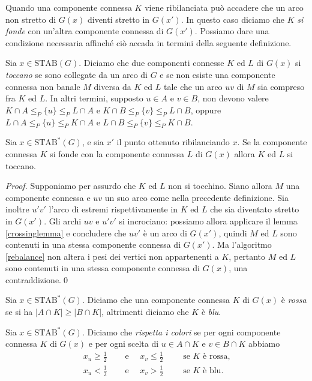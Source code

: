 Quando una componente connessa \(K\) viene ribilanciata pu\`o accadere che un arco non stretto di \(G(x)\) diventi stretto in \(G(x')\). In questo caso diciamo che \(K\) \emph{si fonde} con un'altra componente connessa di \(G(x')\). Possiamo dare una condizione necessaria affinch\'e ci\`o accada in termini della seguente definizione.
\begin{definition}
    Sia \(x\in\text{STAB}(G)\). Diciamo che due componenti connesse \(K\) ed \(L\) di \(G(x)\) si \emph{toccano} se sono collegate da un arco di \(G\) e se non esiste una componente connessa non banale \(M\) diversa da \(K\) ed \(L\) tale che un arco \(uv\) di \(M\) sia compreso fra \(K\) ed \(L\). In altri termini, supposto \(u\in A\) e \(v\in B\), non devono valere \(K\cap A\le_{P}\{u\}\le_{P}L\cap A\) e \(K\cap B\le_{P}\{v\}\le_{P}L\cap B\), oppure \(L\cap A\le_{P}\{u\}\le_{P}K\cap A\) e \(L\cap B\le_{P}\{v\}\le_{P}K\cap B\).
\end{definition}
\begin{lemma}
	\label{touchinglemma} Sia \(x\in\text{STAB}^{*}(G)\), e sia \(x'\) il punto ottenuto ribilanciando \(x\). Se la componente connessa \(K\) si fonde con la componente connessa \(L\) di \(G(x)\) allora \(K\) ed \(L\) si toccano.
\end{lemma}
\begin{proof}
	Supponiamo per assurdo che \(K\) ed \(L\) non si tocchino. Siano allora \(M\) una componente connessa e \(uv\) un suo arco come nella precedente definizione. Sia inoltre \(u'v'\) l'arco di estremi rispettivamente in \(K\) ed \(L\) che sia diventato stretto in \(G(x')\). Gli archi \(uv\) e \(u'v'\) si incrociano: possiamo allora applicare il lemma \ref{crossinglemma} e concludere che \(uv'\) \`e un arco di \(G(x')\), quindi  \(M\) ed \(L\) sono contenuti in una stessa componente connessa di \(G(x')\). Ma l'algoritmo \ref{rebalance} non altera i pesi dei vertici non appartenenti a \(K\), pertanto \(M\) ed \(L\) sono contenuti in una stessa componente connessa di \(G(x)\), una contraddizione.\qed 
\end{proof}
\begin{definition}
	Sia \(x\in\text{STAB}^{*}(G)\). Diciamo che una componente connessa \(K\) di \(G(x)\) è \emph{rossa} se si ha \(|A\cap K|\ge|B\cap K|\), altrimenti diciamo che \(K\) è \emph{blu}. 
\end{definition}
\begin{definition}
    Sia \(x\in\text{STAB}^{*}(G)\). Diciamo che \emph{rispetta i colori} se per ogni componente connessa \(K\) di \(G(x)\) e per ogni scelta di \(u\in A\cap K\) e \(v\in B\cap K\) abbiamo
    \begin{align}
        x_u\ge\frac{1}{2}&\quad\text{ e }\quad x_v\le\frac{1}{2}\qquad\text{ se }K\text{ \`e rossa,} \nonumber \\
        x_u<\frac{1}{2}&\quad\text{ e }\quad x_v>\frac{1}{2}\qquad\text{ se }K\text{ \`e blu.} \nonumber
    \end{align}
\end{definition}
